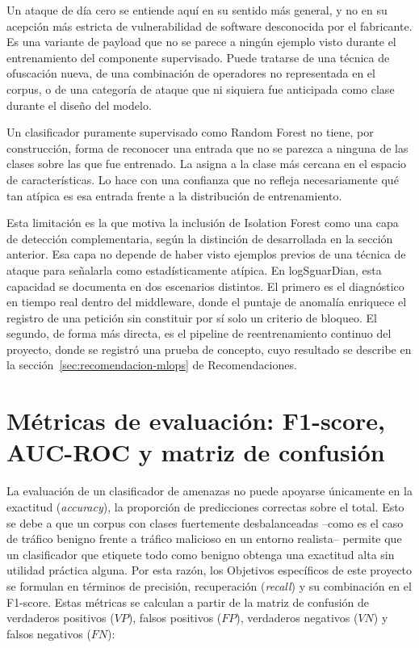 Un ataque de día cero se entiende aquí en su sentido más general, y no en su acepción más estricta de vulnerabilidad de software desconocida por el fabricante. Es una variante de payload que no se parece a ningún ejemplo visto durante el entrenamiento del componente supervisado. Puede tratarse de una técnica de ofuscación nueva, de una combinación de operadores no representada en el corpus, o de una categoría de ataque que ni siquiera fue anticipada como clase durante el diseño del modelo.

Un clasificador puramente supervisado como Random Forest no tiene, por construcción, forma de reconocer una entrada que no se parezca a ninguna de las clases sobre las que fue entrenado. La asigna a la clase más cercana en el espacio de características. Lo hace con una confianza que no refleja necesariamente qué tan atípica es esa entrada frente a la distribución de entrenamiento.

Esta limitación es la que motiva la inclusión de Isolation Forest como una capa de detección complementaria, según la distinción de \textcite{chandola2009} desarrollada en la sección anterior. Esa capa no depende de haber visto ejemplos previos de una técnica de ataque para señalarla como estadísticamente atípica. En logSguarDian, esta capacidad se documenta en dos escenarios distintos. El primero es el diagnóstico en tiempo real dentro del middleware, donde el puntaje de anomalía enriquece el registro de una petición sin constituir por sí solo un criterio de bloqueo. El segundo, de forma más directa, es el pipeline de reentrenamiento continuo del proyecto, donde se registró una prueba de concepto, cuyo resultado se describe en la sección~\ref{sec:recomendacion-mlops} de Recomendaciones.

\section{Métricas de evaluación: F1-score, AUC-ROC y matriz de confusión}

La evaluación de un clasificador de amenazas no puede apoyarse únicamente en la exactitud (\textit{accuracy}), la proporción de predicciones correctas sobre el total. Esto se debe a que un corpus con clases fuertemente desbalanceadas --como es el caso de tráfico benigno frente a tráfico malicioso en un entorno realista-- permite que un clasificador que etiquete todo como benigno obtenga una exactitud alta sin utilidad práctica alguna. Por esta razón, los Objetivos específicos de este proyecto se formulan en términos de precisión, recuperación (\textit{recall}) y su combinación en el F1-score. Estas métricas se calculan a partir de la matriz de confusión de verdaderos positivos ($VP$), falsos positivos ($FP$), verdaderos negativos ($VN$) y falsos negativos ($FN$):

